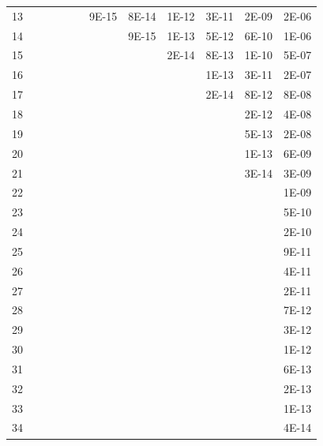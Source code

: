 \documentclass[11pt]{article}
\begin{document}
\begin{table}[htbp]
\begin{tabular}{rrrrrrrrrrrr}
    13    &       &       &       &       &       & 9E-15 & 8E-14 & 1E-12 & 3E-11 & 2E-09 & 2E-06 \\
    14    &       &       &       &       &       &       & 9E-15 & 1E-13 & 5E-12 & 6E-10 & 1E-06 \\
    15    &       &       &       &       &       &       &       & 2E-14 & 8E-13 & 1E-10 & 5E-07 \\
    16    &       &       &       &       &       &       &       &       & 1E-13 & 3E-11 & 2E-07 \\
    17    &       &       &       &       &       &       &       &       & 2E-14 & 8E-12 & 8E-08 \\
    18    &       &       &       &       &       &       &       &       &       & 2E-12 & 4E-08 \\
    19    &       &       &       &       &       &       &       &       &       & 5E-13 & 2E-08 \\
    20    &       &       &       &       &       &       &       &       &       & 1E-13 & 6E-09 \\
    21    &       &       &       &       &       &       &       &       &       & 3E-14 & 3E-09 \\
    22    &       &       &       &       &       &       &       &       &       &       & 1E-09 \\
    23    &       &       &       &       &       &       &       &       &       &       & 5E-10 \\
    24    &       &       &       &       &       &       &       &       &       &       & 2E-10 \\
    25    &       &       &       &       &       &       &       &       &       &       & 9E-11 \\
    26    &       &       &       &       &       &       &       &       &       &       & 4E-11 \\
    27    &       &       &       &       &       &       &       &       &       &       & 2E-11 \\
    28    &       &       &       &       &       &       &       &       &       &       & 7E-12 \\
    29    &       &       &       &       &       &       &       &       &       &       & 3E-12 \\
    30    &       &       &       &       &       &       &       &       &       &       & 1E-12 \\
    31    &       &       &       &       &       &       &       &       &       &       & 6E-13 \\
    32    &       &       &       &       &       &       &       &       &       &       & 2E-13 \\
    33    &       &       &       &       &       &       &       &       &       &       & 1E-13 \\
    34    &       &       &       &       &       &       &       &       &       &       & 4E-14 \\
    \bottomrule
    \end{tabular}%
  \label{tab:addlabel}%
\end{table}%
\end{document}
